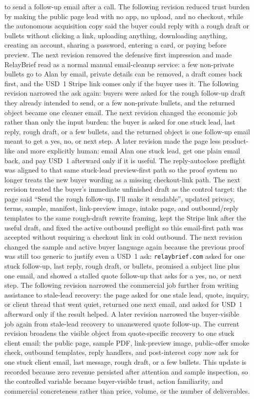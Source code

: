 \documentclass[12pt,letterpaper]{article}
\begin{document}
to send a follow-up email after a call. The following revision reduced trust burden by making the public page lead with no app, no upload, and no checkout, while the autonomous acquisition copy said the buyer could reply with a rough draft or bullets without clicking a link, uploading anything, downloading anything, creating an account, sharing a password, entering a card, or paying before preview. The next revision removed the defensive first impression and made RelayBrief read as a normal manual email-cleanup service: a few non-private bullets go to Alan by email, private details can be removed, a draft comes back first, and the USD~1 Stripe link comes only if the buyer uses it. The following revision narrowed the ask again: buyers were asked for the rough follow-up draft they already intended to send, or a few non-private bullets, and the returned object became one cleaner email. The next revision changed the economic job rather than only the input burden: the buyer is asked for one stuck lead, last reply, rough draft, or a few bullets, and the returned object is one follow-up email meant to get a yes, no, or next step. A later revision made the page less product-like and more explicitly human: email Alan one stuck lead, get one plain email back, and pay USD~1 afterward only if it is useful. The reply-autoclose preflight was aligned to that same stuck-lead preview-first path so the proof system no longer treats the new buyer wording as a missing checkout-link path. The next revision treated the buyer's immediate unfinished draft as the control target: the page said \enquote{Send the rough follow-up. I'll make it sendable}, updated privacy, terms, sample, manifest, link-preview image, intake page, and outbound/reply templates to the same rough-draft rewrite framing, kept the Stripe link after the useful draft, and fixed the active outbound preflight so this email-first path was accepted without requiring a checkout link in cold outbound. The next revision changed the sample and active buyer language again because the previous proof was still too generic to justify even a USD~1 ask: \texttt{relaybrief.com} asked for one stuck follow-up, last reply, rough draft, or bullets, promised a subject line plus one email, and showed a stalled quote follow-up that asks for a yes, no, or next step. The following revision narrowed the commercial job further from writing assistance to stale-lead recovery: the page asked for one stale lead, quote, inquiry, or client thread that went quiet, returned one next email, and asked for USD~1 afterward only if the result helped. A later revision narrowed the buyer-visible job again from stale-lead recovery to unanswered quote follow-up. The current revision broadens the visible object from quote-specific recovery to one stuck client email: the public page, sample PDF, link-preview image, public-offer smoke check, outbound templates, reply handlers, and post-interest copy now ask for one stuck client email, last message, rough draft, or a few bullets. This update is recorded because zero revenue persisted after attention and sample inspection, so the controlled variable became buyer-visible trust, action familiarity, and commercial concreteness rather than price, volume, or the number of deliverables.
\end{document}

